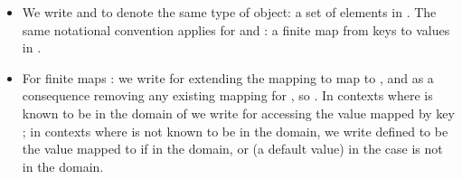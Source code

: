 \begin{itemize}[label=\textbf{-},leftmargin=*]
\item  We write  and  to denote the same type of object: a set
   of elements in . The same notational convention applies for 
   and : a finite map from keys to values in .
\item  For finite maps : we write  for
   extending the mapping  to map  to , and
   as a consequence removing any existing mapping for , so
   . In contexts where  is
   known to be in the domain of  we write  for
   accessing the value mapped by key ; in contexts where  is not
   known to be in the domain, we write  defined to be
   the value mapped to  if in the domain, or  (a default value)
   in the case  is not in the domain.
\end{itemize}

